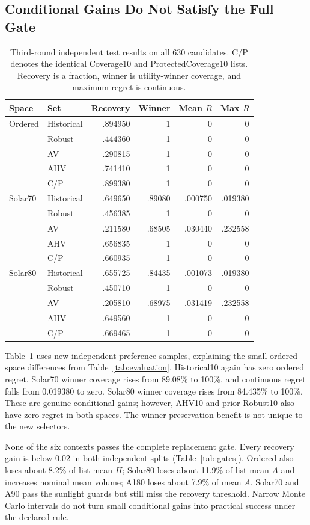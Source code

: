 \documentclass{llncs}
\begin{document}
\subsection{Conditional Gains Do Not Satisfy the Full Gate}
\begin{table}[tbp]\centering\small
\caption{Third-round independent test results on all 630 candidates. C/P denotes the identical Coverage10 and ProtectedCoverage10 lists. Recovery is a fraction, winner is utility-winner coverage, and maximum regret is continuous.}\label{tab:solar}
\begin{tabular}{llrrrr}\toprule
Space & Set & Recovery & Winner & Mean $R$ & Max $R$\\\midrule
Ordered & Historical & .894950 & 1 & 0 & 0\\
 & Robust & .444360 & 1 & 0 & 0\\
 & AV & .290815 & 1 & 0 & 0\\
 & AHV & .741410 & 1 & 0 & 0\\
 & C/P & .899380 & 1 & 0 & 0\\
Solar70 & Historical & .649650 & .89080 & .000750 & .019380\\
 & Robust & .456385 & 1 & 0 & 0\\
 & AV & .211580 & .68505 & .030440 & .232558\\
 & AHV & .656835 & 1 & 0 & 0\\
 & C/P & .660935 & 1 & 0 & 0\\
Solar80 & Historical & .655725 & .84435 & .001073 & .019380\\
 & Robust & .450710 & 1 & 0 & 0\\
 & AV & .205810 & .68975 & .031419 & .232558\\
 & AHV & .649560 & 1 & 0 & 0\\
 & C/P & .669465 & 1 & 0 & 0\\\bottomrule
\end{tabular}\end{table}
Table~\ref{tab:solar} uses new independent preference samples, explaining the small ordered-space differences from Table~\ref{tab:evaluation}. Historical10 again has zero ordered regret. Solar70 winner coverage rises from 89.08\% to 100\%, and continuous regret falls from 0.019380 to zero. Solar80 winner coverage rises from 84.435\% to 100\%. These are genuine conditional gains; however, AHV10 and prior Robust10 also have zero regret in both spaces. The winner-preservation benefit is not unique to the new selectors.


None of the six contexts passes the complete replacement gate. Every recovery gain is below 0.02 in both independent splits (Table~\ref{tab:gates}). Ordered also loses about 8.2\% of list-mean $H$; Solar80 loses about 11.9\% of list-mean $A$ and increases nominal mean volume; A180 loses about 7.9\% of mean $A$. Solar70 and A90 pass the sunlight guards but still miss the recovery threshold. Narrow Monte Carlo intervals do not turn small conditional gains into practical success under the declared rule.
\end{document}
